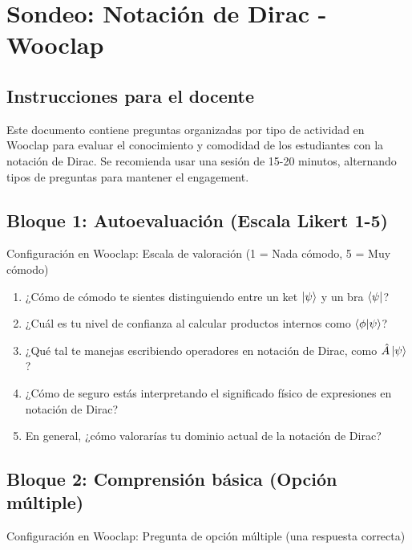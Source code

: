 \documentclass{unirTema}
\begin{document}
\section*{Sondeo: Notación de Dirac - Wooclap}

\subsection*{Instrucciones para el docente}

Este documento contiene preguntas organizadas por tipo de actividad en Wooclap para evaluar el conocimiento y comodidad de los estudiantes con la notación de Dirac. Se recomienda usar una sesión de 15-20 minutos, alternando tipos de preguntas para mantener el engagement.

\subsection*{Bloque 1: Autoevaluación (Escala Likert 1-5)}

Configuración en Wooclap: Escala de valoración (1 = Nada cómodo, 5 = Muy cómodo)

\begin{enumerate}
  \item ¿Cómo de cómodo te sientes distinguiendo entre un ket $\ket{\psi}$ y un bra $\bra{\psi}$?

  \item ¿Cuál es tu nivel de confianza al calcular productos internos como $\braket{\phi}{\psi}$?

  \item ¿Qué tal te manejas escribiendo operadores en notación de Dirac, como $\hat{A}\ket{\psi}$?

  \item ¿Cómo de seguro estás interpretando el significado físico de expresiones en notación de Dirac?

  \item En general, ¿cómo valorarías tu dominio actual de la notación de Dirac?
\end{enumerate}

\subsection*{Bloque 2: Comprensión básica (Opción múltiple)}

Configuración en Wooclap: Pregunta de opción múltiple (una respuesta correcta)
\end{document}
